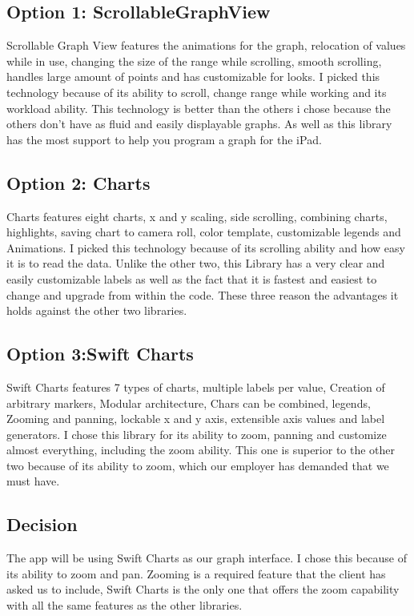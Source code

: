 \documentclass[onecolumn, draftclsnofoot,10pt, compsoc]{IEEEtran}
\begin{document}
\subsection{Option 1: ScrollableGraphView}
Scrollable Graph View features the animations for the graph, relocation of values while in use, changing the size of the range while scrolling, smooth scrolling, handles large amount of points and has customizable for looks. \cite{Github3}
 I picked this technology because of its ability to scroll, change range while working and its workload ability.
This technology is better than the others i chose because the others don't have as fluid and easily displayable graphs.
 As well as this library has the most support to help you program a graph for the iPad.


\subsection{Option 2: Charts}
	Charts features eight charts, x and y scaling, side scrolling, combining charts, highlights, saving chart to camera roll, color template, customizable legends and Animations. \cite{Github4}
I picked this technology because of its scrolling ability and how easy it is to read the data.
Unlike the other two, this Library has a very clear and easily customizable labels as well as the fact that it is fastest and easiest to change and upgrade from within the code.
 These three reason the advantages it holds against the other two libraries.
\subsection{Option 3:Swift Charts}
	Swift Charts features 7 types of charts, multiple labels per value, Creation of arbitrary markers, Modular architecture, Chars can be combined, legends, Zooming and panning, lockable x and y axis, extensible axis values and label generators. \cite{Github5}
I chose this library for its ability to zoom, panning and customize almost everything, including the zoom ability.
 This one is superior to the other two because of its ability to zoom, which our employer has demanded that we must have.
\subsection{Decision }
The app will be using Swift Charts as our graph interface.
 I chose this because of its ability to zoom and pan.
 Zooming is a required feature that the client has asked us to include, Swift Charts is the only one that offers the zoom capability with all the same features as the other libraries.
\end{document}
